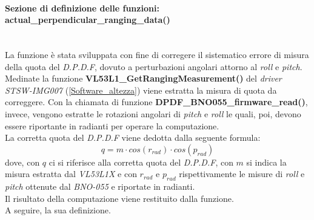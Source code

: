 \paragraph{Sezione di definizione delle funzioni: actual\_perpendicular\_ranging\_data()}\mbox{}\\
La funzione è stata sviluppata con fine di corregere il sistematico errore di misura della quota del \textit{D.P.D.F}, dovuto a perturbazioni angolari attorno al \textit{roll} e \textit{pitch}.\\
Medinate la funzione \textbf{VL53L1\_GetRangingMeasurement()} del \textit{driver STSW-IMG007} (\ref{Software_altezza}) viene estratta la misura di quota da correggere. Con la chiamata di funzione \textbf{DPDF\_BNO055\_firmware\_read()}, invece, vengono estratte le rotazioni angolari di \textit{pitch} e \textit{roll} le quali, poi, devono essere riportante in radianti per operare la computazione.\\
La corretta quota del \textit{D.P.D.F} viene dedotta dalla seguente formula:
\begin{equation}
    q = m\cdot cos(r_{rad})\cdot cos(p_{rad})
\end{equation}
dove, con $q$ ci si riferisce alla corretta quota del \textit{D.P.D.F}, con $m$ si indica la misura estratta dal \textit{VL53L1X} e con $r_{rad}$ e $p_{rad}$ rispettivamente le misure di \textit{roll} e \textit{pitch} ottenute dal \textit{BNO-055} e riportate in radianti.\\
Il risultato della computazione viene restituito dalla funzione.\\
A seguire, la sua definizione.\\



